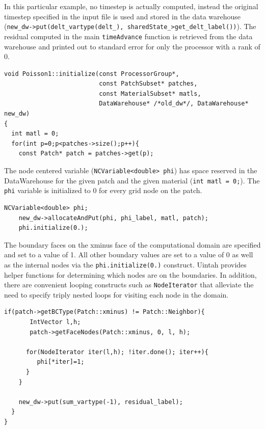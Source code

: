 \documentclass[12pt]{report}
\begin{document}
In this particular example, no timestep is actually computed, instead
the original timestep specified in the input file is used and stored
in the data warehouse (\texttt{new\_dw->put(delt\_vartype(delt\_),
  sharedState\_\->get\_delt\_label())}).  The residual computed in the
main \texttt{timeAdvance} function is retrieved from the data
warehouse and printed out to standard error for only the processor
with a rank of 0.

\begin{Verbatim}[fontsize=\footnotesize]
void Poisson1::initialize(const ProcessorGroup*,
                          const PatchSubset* patches,
                          const MaterialSubset* matls,
                          DataWarehouse* /*old_dw*/, DataWarehouse* new_dw)
{
  int matl = 0;
  for(int p=0;p<patches->size();p++){
    const Patch* patch = patches->get(p);

\end{Verbatim}

The node centered variable (\texttt{NCVariable<double> phi}) has space
reserved in the DataWarehouse for the given patch and the given
material (\texttt{int matl = 0;}).  The \texttt{phi} variable is
initialized to 0 for every grid node on the patch.

\begin{Verbatim}[fontsize=\footnotesize]
    NCVariable<double> phi;
    new_dw->allocateAndPut(phi, phi_label, matl, patch);
    phi.initialize(0.);
\end{Verbatim}

The boundary faces on the xminus face of the computational domain are
specified and set to a value of 1.  All other boundary values are set
to a value of 0 as well as the internal nodes via the
\texttt{phi.initialize(0.)} construct.  Uintah provides helper
functions for determining which nodes are on the boundaries.  In
addition, there are convenient looping constructs such as
\texttt{NodeIterator} that alleviate the need to specify triply nested
loops for visiting each node in the domain.

\begin{Verbatim}[fontsize=\footnotesize]
    if(patch->getBCType(Patch::xminus) != Patch::Neighbor){
       IntVector l,h;
       patch->getFaceNodes(Patch::xminus, 0, l, h);

      for(NodeIterator iter(l,h); !iter.done(); iter++){
         phi[*iter]=1;
      }
    }

    new_dw->put(sum_vartype(-1), residual_label);
  }
}

\end{Verbatim}
\end{document}
